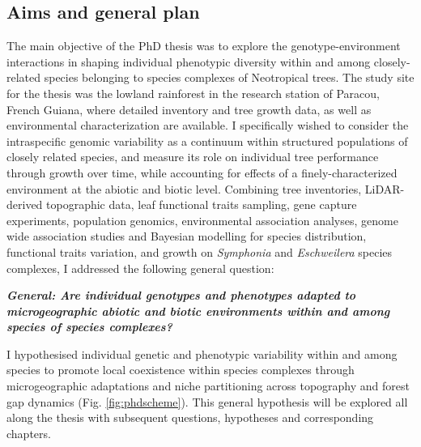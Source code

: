 \documentclass[12pt,twoside,a4paper, a]{article}
\begin{document}
\hypertarget{aims-and-general-plan}{%
\subsection{Aims and general plan}\label{aims-and-general-plan}}

The main objective of the PhD thesis was to explore the genotype-environment interactions in shaping individual phenotypic diversity within and among closely-related species belonging to species complexes of Neotropical trees.
The study site for the thesis was the lowland rainforest in the research station of Paracou, French Guiana, where detailed inventory and tree growth data, as well as environmental characterization are available.
I specifically wished to consider the intraspecific genomic variability as a continuum within structured populations of closely related species, and measure its role on individual tree performance through growth over time, while accounting for effects of a finely-characterized environment at the abiotic and biotic level.
Combining tree inventories, LiDAR-derived topographic data, leaf functional traits sampling, gene capture experiments, population genomics, environmental association analyses, genome wide association studies and Bayesian modelling for species distribution, functional traits variation, and growth on \emph{Symphonia} and \emph{Eschweilera} species complexes, I addressed the following general question:

\textbf{\emph{General: Are individual genotypes and phenotypes adapted to microgeographic abiotic and biotic environments within and among species of species complexes?}}

I hypothesised individual genetic and phenotypic variability within and among species to promote local coexistence within species complexes through microgeographic adaptations and niche partitioning across topography and forest gap dynamics (Fig. \ref{fig:phdscheme}).
This general hypothesis will be explored all along the thesis with subsequent questions, hypotheses and corresponding chapters.
\end{document}

